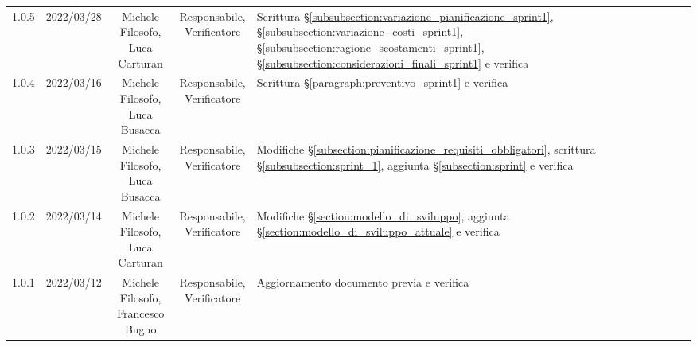 \begin{center}
\begin{longtable}[c]{c | c | c | c | p{5cm}}
		1.0.5                                                      & 2022/03/28 & \Shortunderstack{Michele Filosofo,                                                                                                                                                                  \\Luca Carturan} & \Shortunderstack{Responsabile,\\Verificatore} & Scrittura §\ref{subsubsection:variazione_pianificazione_sprint1}, §\ref{subsubsection:variazione_costi_sprint1}, §\ref{subsubsection:ragione_scostamenti_sprint1}, §\ref{subsubsection:considerazioni_finali_sprint1} e verifica\\
		1.0.4                                                      & 2022/03/16 & \Shortunderstack{Michele Filosofo,                                                                                                                                                                  \\Luca Busacca} & \Shortunderstack{Responsabile,\\Verificatore} & Scrittura §\ref{paragraph:preventivo_sprint1} e verifica\\
		1.0.3                                                      & 2022/03/15 & \Shortunderstack{Michele Filosofo,                                                                                                                                                                  \\Luca Busacca} & \Shortunderstack{Responsabile,\\Verificatore} & Modifiche §\ref{subsection:pianificazione_requisiti_obbligatori}, scrittura §\ref{subsubsection:sprint_1}, aggiunta §\ref{subsection:sprint} e verifica\\
		1.0.2                                                      & 2022/03/14 & \Shortunderstack{Michele Filosofo,                                                                                                                                                                  \\Luca Carturan} & \Shortunderstack{Responsabile,\\Verificatore} & Modifiche §\ref{section:modello_di_sviluppo}, aggiunta §\ref{section:modello_di_sviluppo_attuale} e verifica\\
		1.0.1                                                      & 2022/03/12 & \Shortunderstack{Michele Filosofo,                                                                                                                                                                  \\Francesco Bugno} & \Shortunderstack{Responsabile,\\Verificatore} & Aggiornamento documento previa \RTB{} e verifica\\

\end{longtable}
\end{center}
